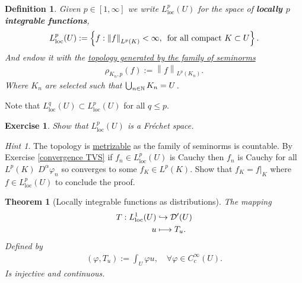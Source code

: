\documentclass[12pt]{article}
\newtheorem{theorem}{Theorem}
\newtheorem{definition}{Definition}
\newtheorem{exercise}{Exercise}
\theoremstyle{remark}
\newtheorem*{hint}{Hint}
\renewcommand{\norm}[1]{\left\lVert #1 \right\rVert}\renewcommand{\abs}[1]{\left| #1 \right|}
\newcommand\restr[2]{\left.#1\right|_{#2}}
\begin{document}
\begin{definition}
	Given $p\in [1,\infty]$ we write $L^p_{\mathrm{loc}}(U)$ for the space of \textbf{locally $p$ integrable functions},
	\begin{align*}
		L^p_{\mathrm{loc}}(U):= \set{f: \norm{f}_{L^p(K)}< \infty, \,\text{   for all compact }  K \subset U}.
	\end{align*}
	And endow it with the \href{https://nowheredifferentiable.com/2023-01-29-PDE-1-Fourier/#:~:text=together-,with,-a%20countable%20family}{topology generated by the family of seminorms}
	\begin{align*}
		\rho_{K_n,p}(f):= \norm{f}_{L^p(K_n)}.
	\end{align*}
	Where $K_n$ are selected such that
	$\bigcup_{n \in \mathbb{N}} K_n =U$.
\end{definition}
Note that $L^q_{\mathrm{loc}}(U) \subset L^p_{\mathrm{loc} }(U)$ for all $q \leq p$.
\begin{exercise}
	Show that $L^p_{\mathrm{loc} }(U)$ is a Fréchet space.
\end{exercise}
\begin{hint}
	The topology is \href{https://nowheredifferentiable.com/2023-01-29-PDE-1-Fourier/#:~:text=together-,with,-a%20countable%20family}{metrizable} as the family of seminorms is countable. By Exercise \ref{convergence TVS}  if $f_n \in L^p_{\mathrm{loc}}(U)$ is Cauchy then $f_n$ is Cauchy for all  $L^p(K)$ $D^\alpha \varphi_n $ so converges to some $f_K \in L^p(K)$. Show that $f_K= \restr{f}{K}$ where $f \in L^p_{\mathrm{loc}}(U)$    to conclude the proof.
\end{hint}
\begin{theorem}[Locally integrable functions as distributions]\label{motivation}
	The mapping
	\begin{align*}
		T:L^1_{\mathrm{loc}}(U) & \hookrightarrow  \mathcal{D}'(U) \\
		u                       & \longmapsto     T_u
		.\end{align*}
	Defined by
	\begin{align}\label{duality}
		(\varphi,T_u):= \int_{U}\varphi u   , \quad\forall \varphi\in C_c^\infty(U).
	\end{align}
	Is injective and continuous.    \end{theorem}
\end{document}
